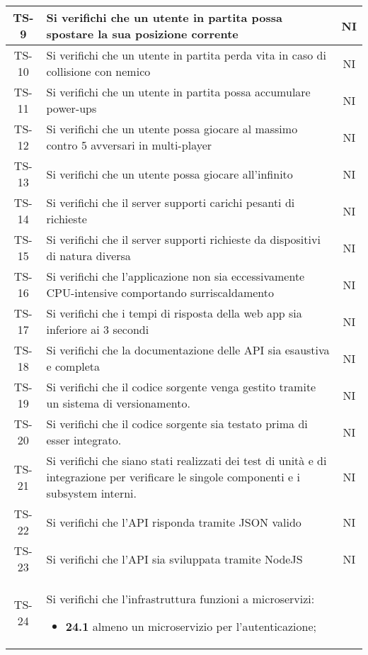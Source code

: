 \begin{center}
\begin{longtable}{|c|p{10cm}|c|}
			 \hline
			 TS-9 & Si verifichi che un utente in partita possa spostare la sua posizione corrente & NI \\
			 \hline
			 TS-10 & Si verifichi che un utente in partita perda vita in caso di collisione con nemico & NI \\
			 \hline
			 TS-11 & Si verifichi che un utente in partita possa accumulare power-ups & NI \\
			 \hline
			 TS-12 & Si verifichi che un utente possa giocare al massimo contro 5 avversari in multi-player & NI \\
			 \hline
			 TS-13 & Si verifichi che un utente possa giocare all'infinito & NI \\
			 \hline
			 TS-14 & Si verifichi che il server supporti carichi pesanti di richieste & NI \\ 
			 \hline
			 TS-15 & Si verifichi che il server supporti richieste da dispositivi di natura diversa & NI \\
			 \hline
			 TS-16 & Si verifichi che l'applicazione non sia eccessivamente CPU-intensive comportando surriscaldamento & NI \\
			 \hline
			 TS-17 & Si verifichi che i tempi di risposta della web app sia inferiore ai 3 secondi & NI \\
			 \hline
			 TS-18 & Si verifichi che la documentazione delle API sia esaustiva e completa & NI \\
			 \hline
			 TS-19 & Si verifichi che il codice sorgente venga gestito tramite un sistema di versionamento. & NI \\
			 \hline
			 TS-20 & Si verifichi che il codice sorgente sia testato prima di esser integrato. & NI \\
			 \hline
			 TS-21 & Si verifichi che siano stati realizzati dei test di unità e di integrazione per verificare le singole componenti e i subsystem interni. & NI \\
			 \hline
			 TS-22 & Si verifichi che l'API risponda tramite JSON valido & NI \\
			 \hline
			 TS-23 & Si verifichi che l'API sia sviluppata tramite NodeJS & NI \\
			 \hline
			 TS-24 & Si verifichi che l'infrastruttura funzioni a microservizi: 
			 \begin{itemize}
			 	\item\textbf{24.1} almeno un microservizio per l'autenticazione;

\end{itemize}
\end{longtable}
\end{center}
